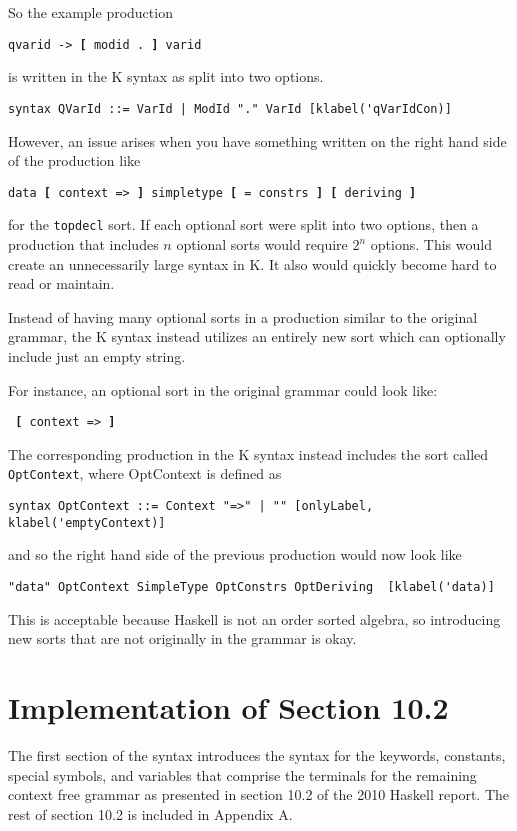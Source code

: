 So the example production

\texttt{qvarid -> \textbf{[} modid . \textbf{]} varid}

is written in the K syntax as split into two options.

\begin{lstlisting}
syntax QVarId ::= VarId | ModId "." VarId [klabel('qVarIdCon)]
\end{lstlisting}

However, an issue arises when you have something written on the right hand side of the production like

\texttt{data \textbf{[} context => \textbf{]} simpletype \textbf{[} = constrs \textbf{]} \textbf{[} deriving \textbf{]}}

for the \texttt{topdecl} sort. If each optional sort were split into two options, then a production that includes $n$ optional sorts would require $2^n$ options. This would create an unnecessarily large syntax in K. It also would quickly become hard to read or maintain.

Instead of having many optional sorts in a production similar to the original grammar, the K syntax instead utilizes an entirely new sort which can optionally include just an empty string.

For instance, an optional sort in the original grammar could look like:

\texttt{ \textbf{[} context => \textbf{]} }

The corresponding production in the K syntax instead includes the sort called \texttt{OptContext}, where OptContext is defined as

\begin{lstlisting}
syntax OptContext ::= Context "=>" | "" [onlyLabel, klabel('emptyContext)]
\end{lstlisting}

and so the right hand side of the previous production would now look like

\begin{lstlisting}
"data" OptContext SimpleType OptConstrs OptDeriving  [klabel('data)]
\end{lstlisting}

This is acceptable because Haskell is not an order sorted algebra, so introducing new sorts that are not originally in the grammar is okay.

\section{Implementation of Section 10.2}
The first section of the syntax introduces the syntax for the keywords, constants, special symbols, and variables that comprise the terminals for the remaining context free grammar as presented in section 10.2 of the 2010 Haskell report. The rest of section 10.2 is included in Appendix A.

